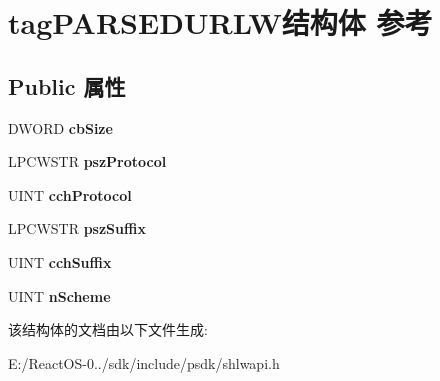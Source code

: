 \hypertarget{structtag_p_a_r_s_e_d_u_r_l_w}{}\section{tag\+P\+A\+R\+S\+E\+D\+U\+R\+L\+W结构体 参考}
\label{structtag_p_a_r_s_e_d_u_r_l_w}
\subsection*{Public 属性}
\begin{DoxyCompactItemize}
\item 
\mbox{\label{structtag_p_a_r_s_e_d_u_r_l_w_a6a2aa3a080990c72411049fffa823d24}} 
D\+W\+O\+RD {\bfseries cb\+Size}
\item 
\mbox{\label{structtag_p_a_r_s_e_d_u_r_l_w_addea2ef8e13a68aec7b5c085911f341e}} 
L\+P\+C\+W\+S\+TR {\bfseries psz\+Protocol}
\item 
\mbox{\label{structtag_p_a_r_s_e_d_u_r_l_w_a1cd7c63a169f6fcaed23eb9c2eddcd25}} 
U\+I\+NT {\bfseries cch\+Protocol}
\item 
\mbox{\label{structtag_p_a_r_s_e_d_u_r_l_w_a2187c3dec911786d688b63d23c0b3679}} 
L\+P\+C\+W\+S\+TR {\bfseries psz\+Suffix}
\item 
\mbox{\label{structtag_p_a_r_s_e_d_u_r_l_w_ac7ceec3a0bca09b452b113b0244b20c0}} 
U\+I\+NT {\bfseries cch\+Suffix}
\item 
\mbox{\label{structtag_p_a_r_s_e_d_u_r_l_w_a7bbba8b02340770768466594654d1ebf}} 
U\+I\+NT {\bfseries n\+Scheme}
\end{DoxyCompactItemize}


该结构体的文档由以下文件生成\+:\begin{DoxyCompactItemize}
\item 
E\+:/\+React\+O\+S-\/0../sdk/include/psdk/shlwapi.\+h\end{DoxyCompactItemize}
